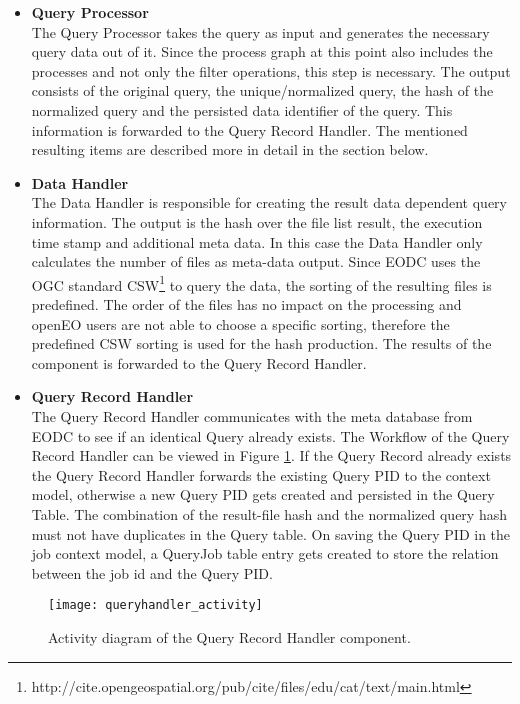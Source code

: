 \documentclass[draft,final]{vutinfth} %
\begin{document}
 \begin{itemize}
	\item \textbf{Query Processor} \\
	The Query Processor takes the query as input and generates the necessary query data out of it. Since the process graph at this point also includes the processes and not only the filter operations, this step is necessary. The output consists of the original query, the unique/normalized query, the hash of the normalized query and the persisted data identifier of the query. This information is forwarded to the Query Record Handler. The mentioned resulting items are described more in detail in the section below.  
	\item \textbf{Data Handler} \\ 
	The Data Handler is responsible for creating the result data dependent query information. The output is the hash over the file list result, the execution time stamp and additional meta data. In this case the Data Handler only calculates the number of files as meta-data output. Since EODC uses the OGC standard CSW\footnote{http://cite.opengeospatial.org/pub/cite/files/edu/cat/text/main.html} to query the data, the sorting of the resulting files is predefined. The order of the files has no impact on the processing and openEO users are not able to choose a specific sorting, therefore the predefined CSW sorting is used for the hash production. The results of the component is forwarded to the Query Record Handler.    
	\item \textbf{Query Record Handler} \\
	The Query Record Handler communicates with the meta database from EODC to see if an identical Query already exists. The Workflow of the Query Record Handler can be viewed in Figure \ref{fig:queryhandler_activity}. If the Query Record already exists the Query Record Handler forwards the existing Query PID to the context model, otherwise a new Query PID gets created and persisted in the Query Table. The combination of the result-file hash and the normalized query hash must not have duplicates in the Query table. On saving the Query PID in the job context model, a QueryJob table entry gets created to store the relation between the job id and the Query PID. 
	
\end{itemize}

\begin{figure}[h]
	\centering
	\texttt{[image: queryhandler\_activity]}
	\caption{Activity diagram of the Query Record Handler component.}
	\label{fig:queryhandler_activity} %
\end{figure}
\end{document}
